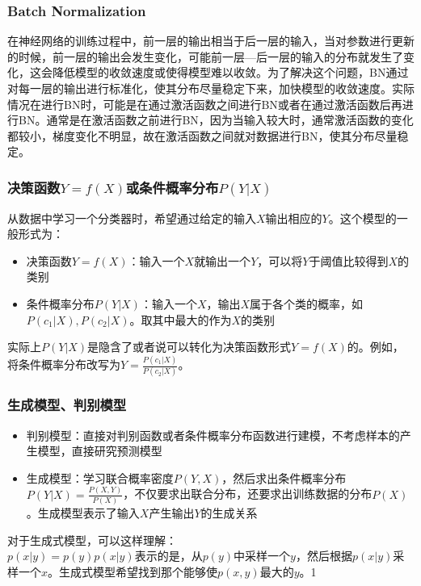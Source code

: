 \subsubsection{Batch Normalization}
在神经网络的训练过程中，前一层的输出相当于后一层的输入，当对参数进行更新的时候，前一层的输出会发生变化，可能前一层---后一层的输入的分布就发生了变化，这会降低模型的收敛速度或使得模型难以收敛。为了解决这个问题，BN通过对每一层的输出进行标准化，使其分布尽量稳定下来，加快模型的收敛速度。实际情况在进行BN时，可能是在通过激活函数之间进行BN或者在通过激活函数后再进行BN。通常是在激活函数之前进行BN，因为当输入较大时，通常激活函数的变化都较小，梯度变化不明显，故在激活函数之间就对数据进行BN，使其分布尽量稳定。


\subsubsection{决策函数$Y=f(X)$或条件概率分布$P(Y|X)$}
从数据中学习一个分类器时，希望通过给定的输入$X$输出相应的$Y$。这个模型的一般形式为：
\begin{itemize}
	\item 决策函数$Y=f(X)$：输入一个$X$就输出一个$Y$，可以将$Y$于阈值比较得到$X$的类别
	\item 条件概率分布$P(Y|X)$：输入一个$X$，输出$X$属于各个类的概率，如$P(c_1 | X), P(c_2 | X)$。取其中最大的作为$X$的类别
\end{itemize}
实际上$P(Y|X)$是隐含了或者说可以转化为决策函数形式$Y=f(X)$的。例如，将条件概率分布改写为$Y = \frac{P(c_1 | X)}{P(c_2 | X) }$。



\subsubsection{生成模型、判别模型}
\begin{itemize}
	\item 判别模型：直接对判别函数或者条件概率分布函数进行建模，不考虑样本的产生模型，直接研究预测模型
	\item 生成模型：学习联合概率密度$P(Y, X)$，然后求出条件概率分布$P(Y|X) = \frac{P(X, Y)}{P(X)}$，不仅要求出联合分布，还要求出训练数据的分布$P(X)$。生成模型表示了输入$X$产生输出$Y$的生成关系
\end{itemize}

对于生成式模型，可以这样理解：\\
$p(x | y) = p(y)p(x | y)$表示的是，从$p(y)$中采样一个$y$，然后根据$p(x|y)$采样一个$x$。生成式模型希望找到那个能够使$p(x, y)$最大的$y$。1


